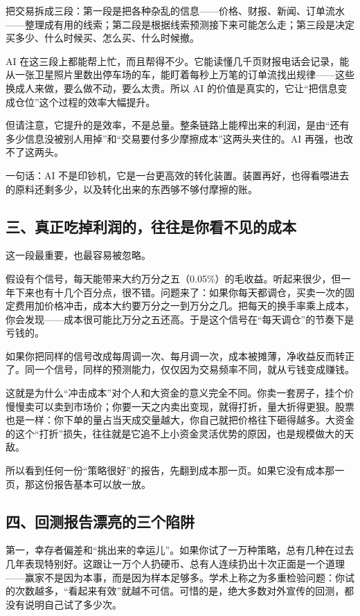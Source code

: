 \documentclass[11pt,a4paper]{ctexart}
\begin{document}
把交易拆成三段：第一段是把各种杂乱的信息——价格、财报、新闻、订单流水——整理成有用的线索；第二段是根据线索预测接下来可能怎么走；第三段是决定买多少、什么时候买、怎么买、什么时候撤。

AI 在这三段上都能帮上忙，而且帮得不少。它能读懂几千页财报电话会记录，能从一张卫星照片里数出停车场的车，能盯着每秒上万笔的订单流找出规律——这些换成人来做，要么做不动，要么太贵。所以 AI 的价值是真实的，它让“把信息变成仓位”这个过程的效率大幅提升。

但请注意，它提升的是效率，不是总量。整条链路上能榨出来的利润，是由“还有多少信息没被别人用掉”和“交易要付多少摩擦成本”这两头夹住的。AI 再强，也改不了这两头。

一句话：AI 不是印钞机，它是一台更高效的转化装置。装置再好，也得看喂进去的原料还剩多少，以及转化出来的东西够不够付摩擦的账。

\subsection*{三、真正吃掉利润的，往往是你看不见的成本}

这一段最重要，也最容易被忽略。

假设有个信号，每天能带来大约万分之五（0.05\%）的毛收益。听起来很少，但一年下来也有十几个百分点，很不错。问题来了：如果你每天都调仓，买卖一次的固定费用加价格冲击，成本大约要万分之一到万分之几。把每天的换手率乘上成本，你会发现——成本很可能比万分之五还高。于是这个信号在“每天调仓”的节奏下是亏钱的。

如果你把同样的信号改成每周调一次、每月调一次，成本被摊薄，净收益反而转正了。同一个信号，同样的预测能力，仅仅因为交易频率不同，就从亏钱变成赚钱。

这就是为什么“冲击成本”对个人和大资金的意义完全不同。你卖一套房子，挂个价慢慢卖可以卖到市场价；你要一天之内卖出变现，就得打折，量大折得更狠。股票也是一样：你下单的量占当天成交量越大，你自己就把价格往下砸得越多。大资金的这个“打折”损失，往往就是它追不上小资金灵活优势的原因，也是规模做大的天敌。

所以看到任何一份“策略很好”的报告，先翻到成本那一页。如果它没有成本那一页，那这份报告基本可以放一放。

\subsection*{四、回测报告漂亮的三个陷阱}

第一，幸存者偏差和“挑出来的幸运儿”。如果你试了一万种策略，总有几种在过去几年表现特别好。这跟让一万个人扔硬币、总有人连续扔出十次正面是一个道理——赢家不是因为本事，而是因为样本足够多。学术上称之为多重检验问题：你试的次数越多，“看起来有效”就越不可信。可惜的是，绝大多数对外宣传的回测，都没有说明自己试了多少次。
\end{document}
